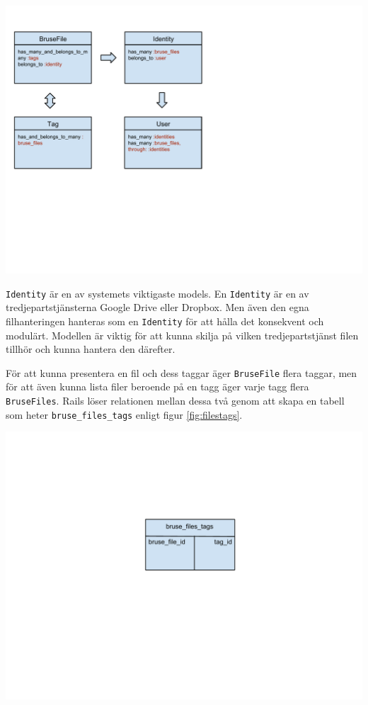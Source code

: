 \begin{Figure}
  \centering
    \includegraphics[width=0.7\linewidth]{figures/model.pdf}
\end{Figure}

\texttt{Identity} är en av  systemets viktigaste models. En \texttt{Identity}
är en av tredjepartstjänsterna Google Drive eller Dropbox. Men även den egna
filhanteringen hanteras som en \texttt{Identity} för att hålla det konsekvent
och modulärt. Modellen är viktig för att kunna skilja på vilken
tredjepartstjänst filen tillhör och kunna hantera den därefter.

För att kunna presentera en fil och dess taggar äger \texttt{BruseFile} flera
taggar, men för att även kunna lista filer beroende på en tagg äger varje tagg
flera \texttt{BruseFiles}. Rails löser relationen mellan dessa två genom att
skapa en tabell som heter \texttt{bruse\_files\_tags} enligt figur
\ref{fig:filestags}.

\begin{Figure}
  \centering
    \includegraphics[width=0.3\linewidth]{figures/filestags.pdf}
\end{Figure}

